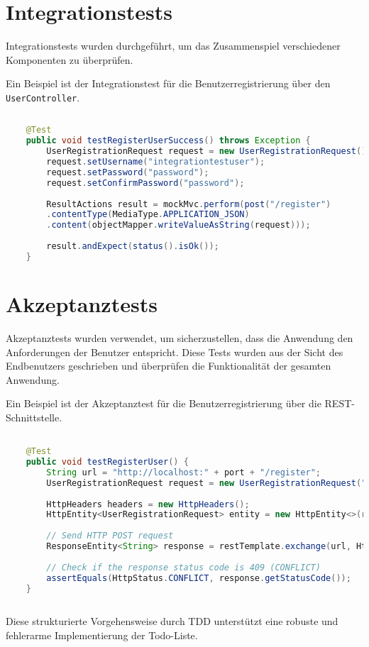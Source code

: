 \section{Integrationstests}

Integrationstests wurden durchgeführt, um das Zusammenspiel verschiedener Komponenten zu überprüfen. 

Ein Beispiel ist der Integrationstest für die Benutzerregistrierung über den \texttt{UserController}.

\begin{lstlisting}[language=Java]
	
	@Test
	public void testRegisterUserSuccess() throws Exception {
		UserRegistrationRequest request = new UserRegistrationRequest();
		request.setUsername("integrationtestuser");
		request.setPassword("password");
		request.setConfirmPassword("password");
		
		ResultActions result = mockMvc.perform(post("/register")
		.contentType(MediaType.APPLICATION_JSON)
		.content(objectMapper.writeValueAsString(request)));
		
		result.andExpect(status().isOk());
	}
\end{lstlisting}


\section{Akzeptanztests}

Akzeptanztests wurden verwendet, um sicherzustellen, dass die Anwendung den Anforderungen der Benutzer entspricht. Diese Tests wurden aus der Sicht des Endbenutzers geschrieben und überprüfen die Funktionalität der gesamten Anwendung.

Ein Beispiel ist der Akzeptanztest für die Benutzerregistrierung über die REST-Schnittstelle.


\begin{lstlisting}[language=Java]

	@Test
	public void testRegisterUser() {
		String url = "http://localhost:" + port + "/register";
		UserRegistrationRequest request = new UserRegistrationRequest("testuser", "password", "password");
		
		HttpHeaders headers = new HttpHeaders();
		HttpEntity<UserRegistrationRequest> entity = new HttpEntity<>(request, headers);
		
		// Send HTTP POST request
		ResponseEntity<String> response = restTemplate.exchange(url, HttpMethod.POST, entity, String.class);
		
		// Check if the response status code is 409 (CONFLICT)
		assertEquals(HttpStatus.CONFLICT, response.getStatusCode());
	}
	
\end{lstlisting}

Diese strukturierte Vorgehensweise durch TDD unterstützt eine robuste und fehlerarme Implementierung der Todo-Liste.

